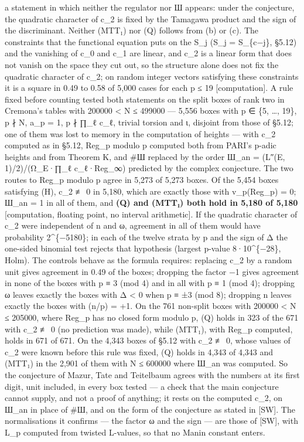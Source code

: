 \documentclass[11pt,a4paper]{article}
\theoremstyle{named}
\begin{document}
a statement in which neither the regulator nor Ш appears: under the conjecture, the quadratic character of c\_2 is fixed by the Tamagawa product and the sign of the discriminant. Neither (MTT₁) nor (Q) follows from (b) or (c). The constraints that the functional equation puts on the S\_j (S\_j = S\_\{c−j\}, §5.12) and the vanishing of c\_0 and c\_1 are linear, and c\_2 is a linear form that does not vanish on the space they cut out, so the structure alone does not fix the quadratic character of c\_2; on random integer vectors satisfying these constraints it is a square in 0.49 to 0.58 of 5,000 cases for each p ≤ 19 [computation]. A rule fixed before counting tested both statements on the split boxes of rank two in Cremona's tables with 200000 \textless{} N ≤ 499000 — 5,556 boxes with p ∈ \{5, …, 19\}, p ∤ N, a\_p = 1, p ∤ ∏\_ℓ c\_ℓ, trivial torsion and ι, disjoint from those of §5.12; one of them was lost to memory in the computation of heights — with c\_2 computed as in §5.12, Reg\_p modulo p computed both from PARI's p-adic heights and from Theorem K, and \#Ш replaced by the order Ш\_an = (L″(E, 1)/2)/(Ω\_E·∏\_ℓ c\_ℓ·Reg\_∞) predicted by the complex conjecture. The two routes to Reg\_p modulo p agree in 5,273 of 5,273 boxes. Of the 5,454 boxes satisfying (H), c\_2 ≢ 0 in 5,180, which are exactly those with v\_p(Reg\_p) = 0; Ш\_an = 1 in all of them, and \textbf{(Q) and (MTT₁) both hold in 5,180 of 5,180} [computation, floating point, no interval arithmetic]. If the quadratic character of c\_2 were independent of n and ω, agreement in all of them would have probability 2\textasciicircum{}\{−5180\}; in each of the twelve strata by p and the sign of Δ the one-sided binomial test rejects that hypothesis (largest p-value 8·10\textasciicircum{}\{−28\}, Holm). The controls behave as the formula requires: replacing c\_2 by a random unit gives agreement in 0.49 of the boxes; dropping the factor −1 gives agreement in none of the boxes with p ≡ 3 (mod 4) and in all with p ≡ 1 (mod 4); dropping ω leaves exactly the boxes with Δ \textless{} 0 when p ≡ ±3 (mod 8); dropping n leaves exactly the boxes with (n/p) = +1. On the 761 non-split boxes with 200000 \textless{} N ≤ 205000, where Reg\_p has no closed form modulo p, (Q) holds in 323 of the 671 with c\_2 ≢ 0 (no prediction was made), while (MTT₁), with Reg\_p computed, holds in 671 of 671. On the 4,343 boxes of §5.12 with c\_2 ≢ 0, whose values of c\_2 were known before this rule was fixed, (Q) holds in 4,343 of 4,343 and (MTT₁) in the 2,901 of them with N ≤ 600000 where Ш\_an was computed. So the conjecture of Mazur, Tate and Teitelbaum agrees with the numbers at its first digit, unit included, in every box tested — a check that the main conjecture cannot supply, and not a proof of anything; it rests on the computed c\_2, on Ш\_an in place of \#Ш, and on the form of the conjecture as stated in [SW]. The normalisations it confirms — the factor ω and the sign — are those of [SW], with L\_p computed from twisted L-values, so that no Manin constant enters.
\end{document}
